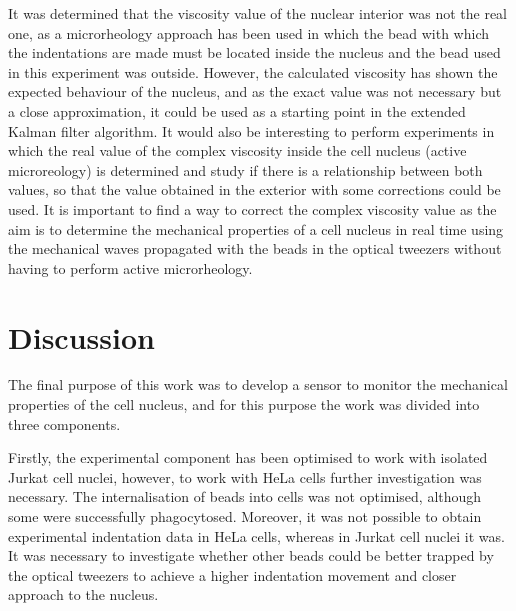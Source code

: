 \documentclass[12pt, a4paper]{article} %
\begin{document}
		\setlength{\parskip}{4mm}
		
	It was determined that the viscosity value of the nuclear interior was not the real one, as a microrheology approach has been used in which the bead with which the indentations are made must be located inside the nucleus and the bead used in this experiment was outside. However, the calculated viscosity has shown the expected behaviour of the nucleus, and as the exact value was not necessary but a close approximation, it could be used as a starting point in the extended Kalman filter algorithm. It would also be interesting to perform experiments in which the real value of the complex viscosity inside the cell nucleus (active microreology) is determined and study if there is a relationship between both values, so that the value obtained in the exterior with some corrections could be used. It is important to find a way to correct the complex viscosity value as the aim is to determine the mechanical properties of a cell nucleus in real time using the mechanical waves propagated with the beads in the optical tweezers without having to perform active microrheology.
	
	
	\newpage
	
	\setlength{\parskip}{0mm}
	
	
	\section{Discussion}
	
	The final purpose of this work was to develop a sensor to monitor the mechanical properties of the cell nucleus, and for this purpose the work was divided into three components. 
	
	\setlength{\parskip}{4mm}
	
	Firstly, the experimental component has been optimised to work with isolated Jurkat cell nuclei, however, to work with HeLa cells further investigation was necessary. The internalisation of beads into cells was not optimised, although some were successfully phagocytosed. Moreover, it was not possible to obtain experimental indentation data in HeLa cells, whereas in Jurkat cell nuclei it was. It was necessary to investigate whether other beads could be better trapped by the optical tweezers to achieve a higher indentation movement and closer approach to the nucleus.
	
\end{document}
